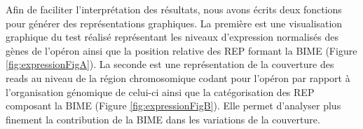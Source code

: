 \documentclass[12pt,a4paper]{report}
\begin{document}
\begin{onehalfspace}
Afin de faciliter l’interprétation des résultats, nous avons écrits deux fonctions pour générer des représentations graphiques. La première est une visualisation graphique du test réalisé représentant les niveaux d’expression normalisés des gènes de l'opéron ainsi que la position relative des REP formant la BIME (Figure \autoref{fig:expressionFigA}). La seconde est une représentation de la couverture des reads au niveau de la région chromosomique codant pour l’opéron par rapport à l'organisation génomique de celui-ci ainsi que la catégorisation des REP composant la BIME (Figure \autoref{fig:expressionFigB}). Elle permet d’analyser plus finement la contribution de la BIME dans les variations de la couverture.

\begin{figure}[h]
\centering
{}

\end{figure}
\end{onehalfspace}
\end{document}
